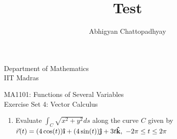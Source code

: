 \documentclass{article}
\title{Test}
\author{Abhigyan Chattopadhyay}
\newcommand{\uvec}[1]{\boldsymbol{\hat{\textbf{#1}}}}
\begin{document}
\begin{center}
\large Department of Mathematics\\
\large IIT Madras

\normalsize MA1101: Functions of Several Variables\\
\normalsize Exercise Set 4: Vector Calculus
\end{center}

\begin{enumerate}
\item Evaluate $\int_{C} \sqrt{x^2+y^2}ds$ along the curve $C$ given by $\vec{r}(t)=(4\cos(t)) \uvec{\i} +(4\sin(t)) \uvec{\j} +3t \uvec{k} ,\ -2\pi \leq t \leq 2\pi$
\end{enumerate}
\end{document}
